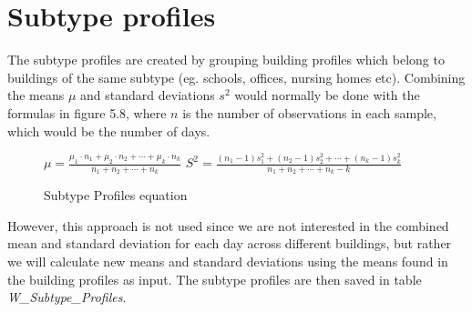 \section*{Subtype profiles}
The subtype profiles are created by grouping building profiles which belong to buildings of the same subtype (eg. schools, offices, nursing homes etc). Combining the means $\mu$ and standard deviations $s^2$ would normally be done with the formulas in figure 5.8, where $n$ is the number of observations in each sample, which would be the number of days.
\begin{figure}
\begin{center}
$\mu = \frac{\mu_1\cdot n_1+\mu_2\cdot n_2+ \cdots +\mu_k\cdot n_k}{n_1+n_2+ \cdots +n_k}$
\newline
\newline
$S^2 = \frac{(n_1-1)s_1^2+(n_2-1)s_2^2+\cdots +(n_k - 1)s_k^2}{n_1 + n_2+\cdots +n_k -k}$
\end{center}
\caption{Subtype Profiles equation}
\end{figure}

However, this approach is not used since we are not interested in the combined mean and standard deviation for each day across different buildings, but rather we will calculate new means and standard deviations using the means found in the building profiles as input. The subtype profiles are then saved in table \emph{W\_Subtype\_Profiles}.
